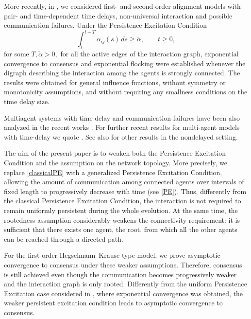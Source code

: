 \documentclass[11pt]{article}
\begin{document}
More recently, in \cite{CCP}, we considered first- and
second-order alignment models with pair- and time-dependent time delays,
non-universal interaction and possible communication failures. Under the
Persistence Excitation Condition
\begin{equation}\label{classicalPE}
	\int_t^{t+T}\alpha_{ij}(s)\,ds\geq {\tilde\alpha},
	\qquad t\geq0,
\end{equation}
for some $T,\tilde \alpha >0,$
for all the active edges of the interaction graph, exponential convergence to
consensus and exponential flocking were established whenever the digraph describing the interaction among the agents is strongly connected. The
results were obtained for general influence functions, without symmetry or
monotonicity assumptions, and without requiring any smallness conditions on the
time delay size.


{Multiagent systems with time delay and communication failures have been also analyzed in the recent works \cite{Cont2, JWL}.} For further recent results for multi-agent models with time-delay we quote \cite{ ChoiCicoPi, ChoiCP, Cico, COP, CicoPi, CHP, Posneg, Dong}. See also \cite{BCGR, BPDS} for other results in the nondelayed setting. 

The aim of the present paper is to weaken both the Persistence Excitation
Condition and the assumption on the network topology. More precisely, we
replace \eqref{classicalPE} with a generalized Persistence Excitation
Condition, allowing the amount of communication among connected
agents over intervals of fixed length to progressively decrease with time (see \eqref{PE}).
Thus, differently from the classical Persistence Excitation Condition, the
interaction is not required to remain uniformly persistent during the whole
evolution. At the same time, the rootedness assumption considerably weakens
the connectivity requirement: it is sufficient that there exists one agent,
the root, from which all the other agents can be reached through a directed
path.

For the first-order Hegselmann--Krause type model, we prove asymptotic
convergence to consensus under these weaker assumptions.
Therefore, consensus is still achieved even though the communication becomes
progressively weaker and the interaction graph is only rooted. Differently
from the uniform Persistence Excitation case considered in
\cite{CCP}, where exponential convergence was obtained,
the weaker persistent excitation condition leads to asymptotic convergence to
consensus.
\end{document}
